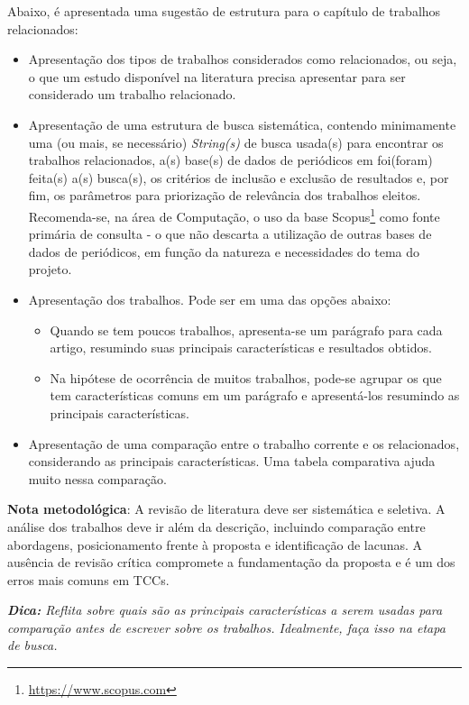 \documentclass{eic-bcc-tcc}
\begin{document}
Abaixo, é apresentada uma sugestão de estrutura para o capítulo de trabalhos relacionados:
\begin{itemize}
    \item Apresentação dos tipos de trabalhos considerados como relacionados, ou seja, o que um estudo disponível na literatura precisa apresentar para ser considerado um trabalho relacionado.
    
    \item Apresentação de uma estrutura de busca sistemática, contendo minimamente uma (ou mais, se necessário) \textit{String(s)} de busca usada(s) para encontrar os trabalhos relacionados, a(s) base(s) de dados de periódicos em foi(foram) feita(s) a(s) busca(s), os critérios de inclusão e exclusão de resultados e, por fim, os parâmetros para priorização de relevância dos trabalhos eleitos. Recomenda-se, na área de Computação, o uso da base Scopus\footnote{\url{https://www.scopus.com}} como fonte primária de consulta - o que não descarta a utilização de outras bases de dados de periódicos, em função da natureza e necessidades do tema do projeto.
    
    \item Apresentação dos trabalhos. Pode ser em uma das opções abaixo:
    \begin{itemize}
        \item Quando se tem poucos trabalhos, apresenta-se um parágrafo para cada artigo, resumindo suas principais características e resultados obtidos.
        \item Na hipótese de ocorrência de muitos trabalhos, pode-se agrupar os que tem características comuns em um parágrafo e apresentá-los resumindo as principais características.
    \end{itemize}
    
    \item Apresentação de uma comparação entre o trabalho corrente e os relacionados, considerando as principais características. Uma tabela comparativa ajuda muito nessa comparação.
\end{itemize}

\textbf{Nota metodológica}: A revisão de literatura deve ser sistemática e seletiva. A análise dos trabalhos deve ir além da descrição, incluindo comparação entre abordagens, posicionamento frente à proposta e identificação de lacunas. A ausência de revisão crítica compromete a fundamentação da proposta e é um dos erros mais comuns em TCCs.

\textit{\textbf{Dica:} Reflita sobre quais são as principais características a serem usadas para comparação antes de escrever sobre os trabalhos. Idealmente, faça isso na etapa de busca.}
\end{document}
